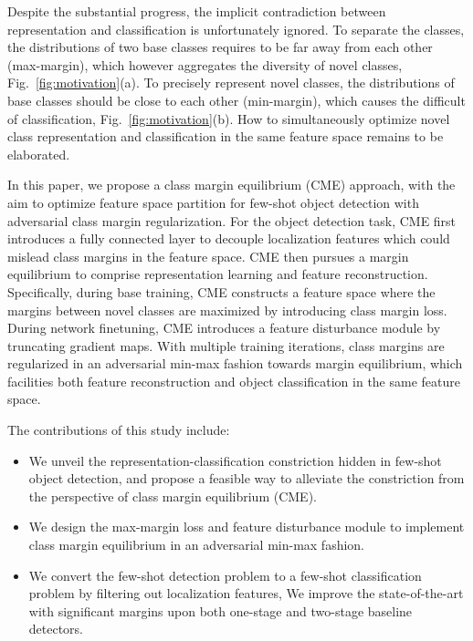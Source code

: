 \documentclass[final]{cvpr}
\begin{document}
Despite the substantial progress, the implicit contradiction between representation and classification is unfortunately ignored. To separate the classes, the distributions of two base classes requires to be far away from each other (max-margin), which however aggregates the diversity of novel classes, Fig.~\ref{fig:motivation}(a). To precisely represent novel classes, the distributions of base classes should be close to each other (min-margin), which causes the difficult of classification, Fig.~\ref{fig:motivation}(b). How to simultaneously optimize novel class representation and classification in the same feature space remains to be elaborated.

In this paper, we propose a class margin equilibrium (CME) approach, with the aim to optimize feature space partition for few-shot object detection with adversarial class margin regularization. For the object detection task, CME first introduces a fully connected layer to decouple localization features which could mislead class margins in the feature space. CME then pursues a margin equilibrium to comprise representation learning and feature reconstruction. Specifically, during base training, CME constructs a feature space where the margins between novel classes are maximized by introducing class margin loss. During network finetuning, CME introduces a feature disturbance module by truncating gradient maps. With multiple training iterations, class margins are regularized in an adversarial min-max fashion towards margin equilibrium, which facilities both feature reconstruction and object classification in the same feature space.

 The contributions of this study include:
\begin{itemize}
    \item We unveil the representation-classification constriction hidden in few-shot object detection, and propose a feasible way to alleviate the constriction from the perspective of class margin equilibrium (CME).
    
    \item We design the max-margin loss and feature disturbance module to implement class margin equilibrium in an adversarial min-max fashion.
    
    \item We convert the few-shot detection problem to a few-shot classification problem by filtering out localization features, We improve the state-of-the-art with significant margins upon both one-stage and two-stage baseline detectors.
\end{itemize}
\end{document}
